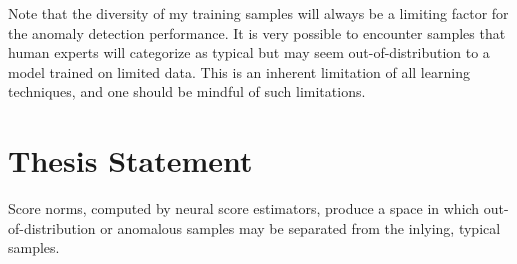 Note that the diversity of my training samples will always be a limiting factor for the anomaly detection performance. It is very possible to encounter samples that human experts will categorize as typical but may seem out-of-distribution to a model trained on limited data. This is an inherent limitation of all learning techniques, and one should be mindful of such limitations.

\section{Thesis Statement}

Score norms, computed by neural score estimators, produce a space in which out-of-distribution or anomalous samples may be separated from the inlying, typical samples.